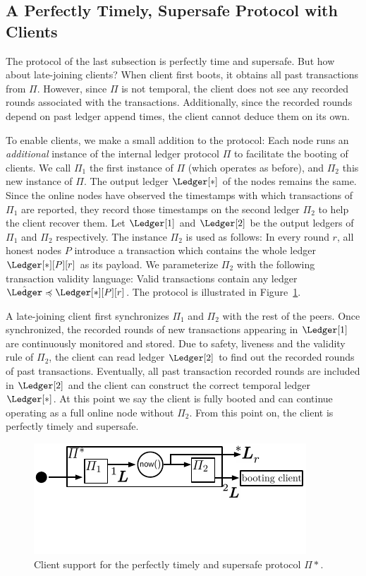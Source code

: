 \subsection{A Perfectly Timely, Supersafe Protocol with Clients}

The protocol of the last subsection is perfectly time and supersafe.
But how about late-joining clients?
When client first boots, it obtains all past transactions
from $\Pi$.
However, since $\Pi$ is not temporal, the client does not see any recorded rounds
associated with the transactions. Additionally, since the recorded rounds depend
on past ledger append times, the client cannot deduce them on its own.

To enable clients, we make a small addition to the protocol:
Each node runs an \emph{additional} instance of the internal
ledger protocol $\Pi$
to facilitate the booting of clients.
We call $\Pi_1$ the first instance of $\Pi$
(which operates as before),
and $\Pi_2$ this new instance of $\Pi$.
The output ledger $\Ledger[*]$ of the nodes remains the same.
Since the online nodes have observed the timestamps with which
transactions of $\Pi_1$ are reported, they record those
timestamps on the second ledger $\Pi_2$ to help the client
recover them.
Let $\Ledger[1]$ and $\Ledger[2]$ be the output ledgers
of $\Pi_1$ and $\Pi_2$ respectively.
The instance $\Pi_2$ is used as follows:
In every round $r$, all honest nodes $P$ introduce a transaction
which contains the whole ledger $\Ledger[*][P][r]$ as its payload.
We parameterize $\Pi_2$ with the following transaction validity language:
Valid transactions contain any ledger $\hat \Ledger \preccurlyeq \Ledger[*][P][r]$.
The protocol is illustrated in Figure~\ref{fig:client-support}.

A late-joining client first synchronizes $\Pi_1$ and $\Pi_2$ with the rest
of the peers. Once synchronized, the recorded rounds of new
transactions appearing in $\Ledger[1]$ are continuously monitored and stored.
Due to safety, liveness and the validity rule of $\Pi_2$,
the client can read ledger $\Ledger[2]$ to find out the
recorded rounds of past transactions.
Eventually, all past transaction recorded rounds are included in $\Ledger[2]$
and the client can construct the correct temporal ledger $\Ledger[*]$.
At this point we say the client is fully booted and can continue
operating as a full online node without $\Pi_2$.
From this point on, the client is perfectly timely and supersafe.

\begin{figure}
  \centering
  \includegraphics[width=0.7\columnwidth,keepaspectratio]{figures/perfectly-timely-clients.pdf}
  \caption{Client support for the perfectly timely and supersafe protocol $\Pi*$.
  }
 \label{fig:client-support}
\end{figure}

